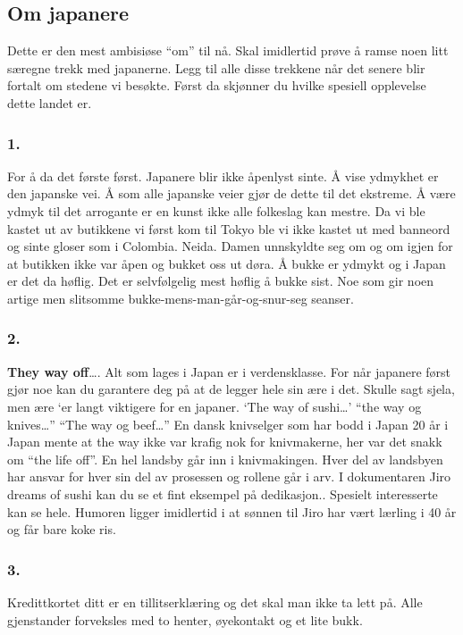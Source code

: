 \subsection{Om japanere}
Dette er den mest ambisiøse ``om'' til nå. Skal imidlertid prøve å
ramse noen litt særegne trekk med japanerne. Legg til alle disse
trekkene når det senere blir fortalt om stedene vi besøkte. Først da
skjønner du hvilke spesiell opplevelse dette landet er.\\


\subsubsection{1.}
For å da det første først. Japanere blir ikke åpenlyst
sinte. Å vise ydmykhet er den japanske vei. Å som alle
japanske veier gjør de dette til det ekstreme. Å være
ydmyk til det arrogante er en kunst ikke alle folkeslag kan
mestre. 
Da vi ble kastet ut av butikkene vi først kom til
Tokyo ble vi ikke kastet ut med banneord og sinte
gloser som i Colombia. Neida. Damen unnskyldte seg
om og om igjen for at butikken ikke var åpen og bukket
oss ut døra. Å bukke er ydmykt og i Japan er det da
høflig. Det er selvfølgelig mest høflig å bukke
sist. Noe som gir noen artige men slitsomme
bukke-mens-man-går-og-snur-seg seanser. 

\subsubsection{2.}
\textbf{They way off}\ldots.
Alt som lages i Japan er i verdensklasse. For når
japanere først gjør noe kan du garantere deg på at de
legger hele sin ære i det. Skulle sagt sjela, men ære
`er langt viktigere for en japaner. `The way of
sushi\ldots'
``the way og knives\ldots'' ``The way og beef\ldots'' En dansk
knivselger som har bodd i Japan 20 år i Japan
mente at the way ikke var krafig nok for knivmakerne, her
var det snakk om ``the life off''. En hel landsby går
inn i knivmakingen. Hver del av landsbyen har
ansvar for hver sin del av prosessen og rollene går i
arv. I dokumentaren
Jiro dreams of sushi kan du se et fint eksempel på
dedikasjon.. 
Spesielt interesserte kan se hele. Humoren ligger
imidlertid i at sønnen til Jiro har vært lærling i 40
år og får bare koke ris. 

\subsubsection{3.}
Kredittkortet ditt er
en tillitserklæring og det skal man ikke ta lett på.
Alle gjenstander forveksles med to henter, øyekontakt og et
lite bukk. 

